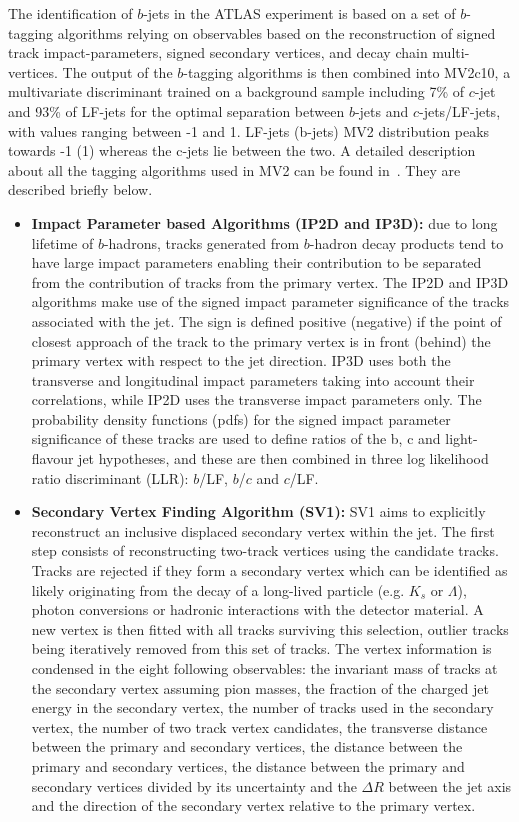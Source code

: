 The identification of $b$-jets in the ATLAS experiment is based on a set of $b$-tagging algorithms relying on observables based on the reconstruction of signed track impact-parameters, signed secondary
vertices, and decay chain multi-vertices. The output of the $b$-tagging algorithms is then combined into MV2c10, a multivariate discriminant trained on a background sample including 7\% of $c$-jet and 93\% of LF-jets for the optimal separation between $b$-jets and $c$-jets/LF-jets, with values ranging between -1 and 1. LF-jets (b-jets) MV2 distribution peaks towards -1 (1) whereas the c-jets lie between the two. A detailed description about all the tagging algorithms used in MV2 can be found in~\cite{perf_run2,perf_run2_2}. They are described briefly below.

\begin{itemize}

\item \textbf{Impact Parameter based Algorithms (IP2D and IP3D):} due to long lifetime of $b$-hadrons, tracks generated from $b$-hadron decay products tend to have large impact parameters enabling their contribution to be separated from the contribution of tracks from the primary vertex. The IP2D and IP3D algorithms make use of the signed impact parameter significance of the tracks associated with the jet. The sign is defined positive (negative) if the point of closest approach of the track to the primary vertex is in front (behind) the primary vertex with respect to the jet direction. IP3D uses both the transverse and longitudinal impact parameters taking into account their correlations, while IP2D uses the transverse impact parameters only. The probability density functions (pdfs) for the signed impact parameter significance of these tracks are used to define ratios of the b, c and light-flavour jet hypotheses, and these are then combined in three log likelihood ratio discriminant (LLR): $b$/LF, $b$/$c$ and $c$/LF.
 
\item \textbf{Secondary Vertex Finding Algorithm (SV1):} SV1 aims to explicitly reconstruct an inclusive displaced secondary vertex within the jet. The first step consists of reconstructing two-track vertices using the candidate tracks. Tracks are rejected if they form a secondary vertex which can be identified as likely originating from the decay of a long-lived particle (e.g. $K_s$ or $\Lambda$), photon conversions or hadronic interactions with the detector material. A new vertex is then fitted with all tracks surviving this selection, outlier tracks being iteratively removed from this set of tracks. The vertex information is condensed in the eight following observables: the invariant mass of tracks at the secondary vertex assuming pion masses, the fraction of the charged jet energy in the secondary vertex, the number of tracks used in the secondary vertex, the number of two track vertex candidates, the transverse distance between the primary and secondary vertices, the distance between the primary and secondary vertices, the distance between the primary and secondary vertices divided by its uncertainty and the $\Delta R$ between the jet axis and the direction of the secondary vertex relative to the primary vertex. 


\end{itemize}
